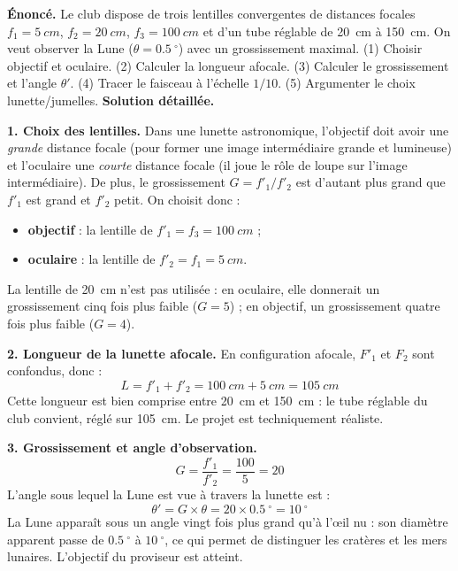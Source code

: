 \documentclass[11pt]{article}
\providecommand{\degree}{^{\circ}}
\begin{document}
\begin{exoresolu}
\textbf{Énoncé.} Le club dispose de trois lentilles convergentes de distances focales $f_1 = \SI{5}{cm}$, $f_2 = \SI{20}{cm}$, $f_3 = \SI{100}{cm}$ et d'un tube réglable de \SI{20}{cm} à \SI{150}{cm}. On veut observer la Lune ($\theta = \SI{0,5}{\degree}$) avec un grossissement maximal. (1) Choisir objectif et oculaire. (2) Calculer la longueur afocale. (3) Calculer le grossissement et l'angle $\theta'$. (4) Tracer le faisceau à l'échelle $1/10$. (5) Argumenter le choix lunette/jumelles.
\tcblower
\textbf{Solution détaillée.}

\textbf{1. Choix des lentilles.} Dans une lunette astronomique, l'objectif doit avoir une \emph{grande} distance focale (pour former une image intermédiaire grande et lumineuse) et l'oculaire une \emph{courte} distance focale (il joue le rôle de loupe sur l'image intermédiaire). De plus, le grossissement $G = f'_1/f'_2$ est d'autant plus grand que $f'_1$ est grand et $f'_2$ petit. On choisit donc :
\begin{itemize}
\item \textbf{objectif} : la lentille de $f'_1 = f_3 = \SI{100}{cm}$ ;
\item \textbf{oculaire} : la lentille de $f'_2 = f_1 = \SI{5}{cm}$.
\end{itemize}
La lentille de \SI{20}{cm} n'est pas utilisée : en oculaire, elle donnerait un grossissement cinq fois plus faible ($G=5$) ; en objectif, un grossissement quatre fois plus faible ($G=4$).

\textbf{2. Longueur de la lunette afocale.} En configuration afocale, $F'_1$ et $F_2$ sont confondus, donc :
\[ L = f'_1 + f'_2 = \SI{100}{cm} + \SI{5}{cm} = \SI{105}{cm} \]
Cette longueur est bien comprise entre \SI{20}{cm} et \SI{150}{cm} : le tube réglable du club convient, réglé sur \SI{105}{cm}. Le projet est techniquement réaliste.

\textbf{3. Grossissement et angle d'observation.}
\[ G = \frac{f'_1}{f'_2} = \frac{100}{5} = 20 \]
L'angle sous lequel la Lune est vue à travers la lunette est :
\[ \theta' = G \times \theta = 20 \times \SI{0,5}{\degree} = \SI{10}{\degree} \]
La Lune apparaît sous un angle vingt fois plus grand qu'à l'œil nu : son diamètre apparent passe de $\SI{0,5}{\degree}$ à $\SI{10}{\degree}$, ce qui permet de distinguer les cratères et les mers lunaires. L'objectif du proviseur est atteint.


\end{exoresolu}
\end{document}
